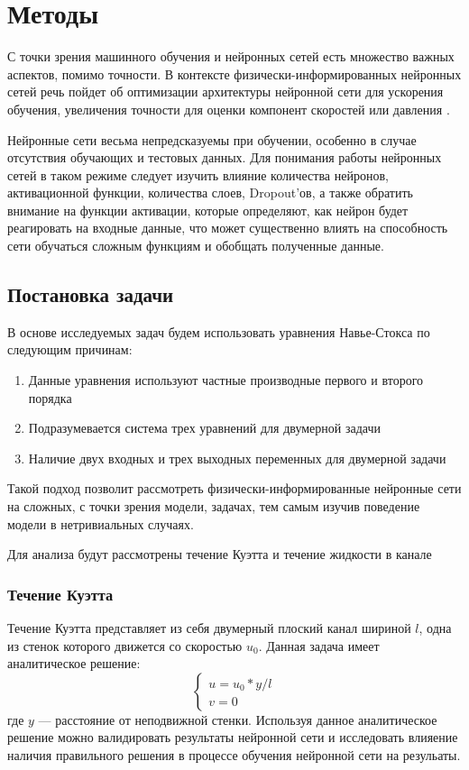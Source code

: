 \chapter{Методы}
С точки зрения машинного обучения и нейронных сетей есть множество важных аспектов,
помимо точности. В контексте физически-информированных нейронных сетей речь пойдет
об оптимизации архитектуры нейронной сети для ускорения обучения, увеличения точности
для оценки компонент скоростей или давления \cite{Tommaso2024pinn}.

Нейронные сети весьма непредсказуемы при обучении, особенно в случае отсутствия
обучающих и тестовых данных. Для понимания работы нейронных сетей в таком режиме
следует изучить влияние количества нейронов, активационной функции, количества слоев,
Dropout'ов, а также обратить внимание на функции активации, которые определяют,
как нейрон будет реагировать на входные данные, что может существенно влиять на способность
сети обучаться сложным функциям и обобщать полученные данные.
\section{Постановка задачи}
В основе исследуемых задач будем использовать уравнения Навье-Стокса по следующим
причинам:
\begin{enumerate}
    \item Данные уравнения используют частные производные первого и второго порядка
    \item Подразумевается система трех уравнений для двумерной задачи
    \item Наличие двух входных и трех выходных переменных для двумерной задачи
\end{enumerate}
Такой подход позволит рассмотреть физически-информированные нейронные сети на сложных,
с точки зрения модели, задачах, тем самым изучив поведение модели в нетривиальных случаях.

Для анализа будут рассмотрены течение Куэтта и течение жидкости в канале
\subsection{Течение Куэтта}

Течение Куэтта представляет из себя двумерный плоский канал шириной $l$, одна из стенок которого 
движется со скоростью $u_0$. Данная задача имеет аналитическое решение:
\begin{equation}
    \begin{cases}
        u = u_0 * y / l \\
        v = 0
    \end{cases}
\end{equation}
где $y$ --- расстояние от неподвижной стенки.
Используя данное аналитическое решение можно валидировать результаты нейронной сети и
исследовать влияение наличия правильного решения в процессе обучения нейронной сети на
резульаты.
